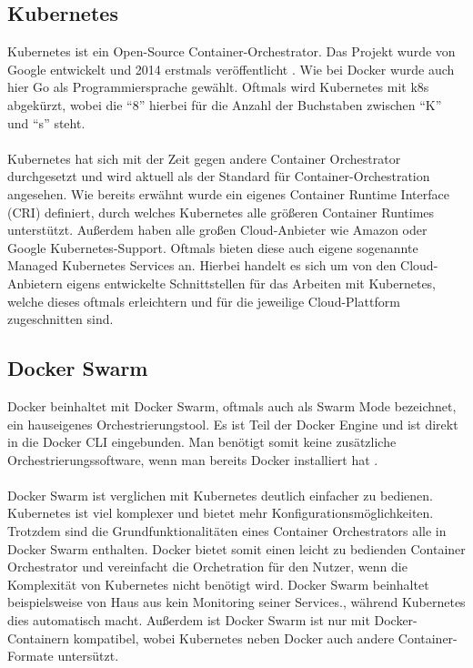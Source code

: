 \subsection{Kubernetes}
Kubernetes ist ein Open-Source Container-Orchestrator. Das Projekt wurde von Google entwickelt und 2014 erstmals veröffentlicht \cite{noauthor_kubernetes_2021}. Wie bei Docker wurde auch hier Go als Programmiersprache gewählt. Oftmals wird Kubernetes mit k8s abgekürzt, wobei die “8” hierbei für die Anzahl der Buchstaben zwischen “K” und “s” steht.
\\\\
Kubernetes hat sich mit der Zeit gegen andere Container Orchestrator durchgesetzt und wird aktuell als der Standard für Container-Orchestration angesehen. Wie bereits erwähnt wurde ein eigenes Container Runtime Interface (CRI) definiert, durch welches Kubernetes alle größeren Container Runtimes unterstützt. Außerdem haben alle großen Cloud-Anbieter wie Amazon oder Google Kubernetes-Support. Oftmals bieten diese auch eigene sogenannte Managed Kubernetes Services an. Hierbei handelt es sich um von den Cloud-Anbietern eigens entwickelte Schnittstellen für das Arbeiten mit Kubernetes, welche dieses oftmals erleichtern und für die jeweilige Cloud-Plattform zugeschnitten sind.

\subsection{Docker Swarm}
Docker beinhaltet mit Docker Swarm, oftmals auch als Swarm Mode bezeichnet, ein hauseigenes Orchestrierungstool. Es ist Teil der Docker Engine und ist direkt in die Docker CLI eingebunden. Man benötigt somit keine zusätzliche Orchestrierungssoftware, wenn man bereits Docker installiert hat \cite{noauthor_dockerswarm_2021}.
\\\\
Docker Swarm ist verglichen mit Kubernetes deutlich einfacher zu bedienen. Kubernetes ist viel komplexer und bietet mehr Konfigurationsmöglichkeiten. Trotzdem sind die Grundfunktionalitäten eines Container Orchestrators alle in Docker Swarm enthalten. Docker bietet somit einen leicht zu bedienden Container Orchestrator und vereinfacht die Orchetration für den Nutzer, wenn die Komplexität von Kubernetes nicht benötigt wird. Docker Swarm beinhaltet beispielsweise von Haus aus kein Monitoring seiner Services., während Kubernetes dies automatisch macht. Außerdem ist Docker Swarm ist nur mit Docker-Containern kompatibel, wobei Kubernetes neben Docker auch andere Container-Formate untersützt.

